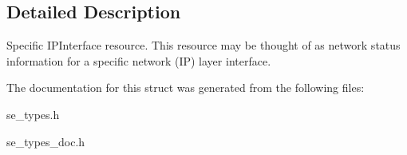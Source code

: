 \subsection{Detailed Description}
Specific I\+P\+Interface resource. This resource may be thought of as network status information for a specific network (IP) layer interface. 

The documentation for this struct was generated from the following files\+:\begin{DoxyCompactItemize}
\item 
se\+\_\+types.\+h\item 
se\+\_\+types\+\_\+doc.\+h\end{DoxyCompactItemize}
